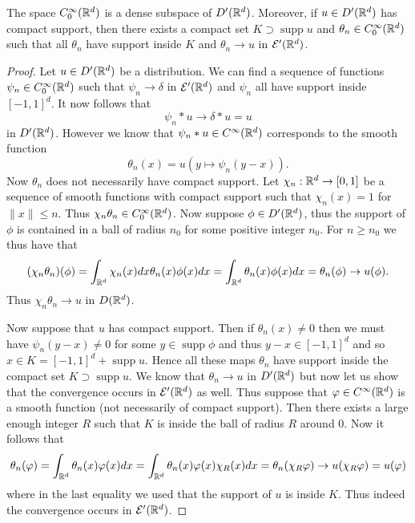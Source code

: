 \documentclass[twoside, a4paper, 10pt]{amsart}
\begin{document}
\begin{thm} The space $C_0^{\infty}(\mathbb{R}^d)$ is a dense subspace of $D'(\mathbb{R}^d)$. Moreover, if $u \in D'(\mathbb{R}^d)$ has compact support, then there exists a compact set $K \supset \operatorname{supp} u$ and $\theta_n \in C_0^{\infty}(\mathbb{R}^d)$  such that all $\theta_n$ have support inside $K$ and $\theta_n \to u$ in $\mathcal{E}'(\mathbb{R}^d)$.

\end{thm}

\begin{proof} Let $u \in D'(\mathbb{R}^d)$ be a distribution. We can find a sequence of functions $\psi_n \in C_0^{\infty}(\mathbb{R}^d)$ such that $\psi_n \to \delta$ in $\mathcal{E}'(\mathbb{R}^d)$ and $\psi_n$ all have support inside $[-1,1]^d$. It now follows that $$\psi_n * u \to \delta * u = u$$ in $D'(\mathbb{R}^d)$. However we know that $\psi_n * u \in C^{\infty}(\mathbb{R}^d)$ corresponds to the smooth function $$\theta_n(x) = u(y \mapsto \psi_n(y-x)).$$ Now $\theta_n$ does not necessarily have compact support. Let $\chi_n:\mathbb{R}^d \to [0,1]$ be a sequence of smooth functions with compact support such that $\chi_n(x)=1$ for $\|x \| \leq n$. Thus $\chi_n \theta_n \in C_0^{\infty}(\mathbb{R}^d)$. Now suppose $\phi \in D'(\mathbb{R}^d)$, thus the support of $\phi$ is contained in a ball of radius $n_0$ for some positive integer $n_0$. For $n\geq n_0$ we thus have that $$(\chi_n\theta_n) (\phi) = \int_{\mathbb{R}^d} \chi_n(x) dx \theta_n(x) \phi(x) dx = \int_{\mathbb{R}^d} \theta_n(x)\phi(x) dx = \theta_n(\phi) \to u(\phi). $$ Thus $\chi_n \theta_n \to u$ in $D(\mathbb{R}^d)$.

Now suppose that $u$ has compact support. Then if $\theta_n(x) \neq 0$ then we must have $\psi_n(y-x) \neq 0$ for some $y \in \operatorname{supp}\phi$ and thus $y-x \in [-1,1]^d$ and so $x \in K = [-1,1]^d + \operatorname{supp} u$. Hence all these maps $\theta_n$ have support inside the compact set $K \supset \operatorname{supp} u$. We know that $\theta_n \to u$ in $D'(\mathbb{R}^d)$ but now let us show that the convergence occurs in $\mathcal{E}'(\mathbb{R}^d)$ as well. Thus suppose that $\varphi \in C^{\infty}(\mathbb{R}^d)$ is a smooth function (not necessarily of compact support). Then there exists a large enough integer $R$ such that $K$ is inside the ball of radius $R$ around $0$. Now it follows that $$\theta_n(\varphi) = \int_{\mathbb{R}^d} \theta_n(x)\varphi(x) dx = \int_{\mathbb{R}^d} \theta_n(x)\varphi(x)\chi_R(x) dx = \theta_n(\chi_R \varphi) \to u(\chi_R\varphi) = u(\varphi) $$ where in the last equality we used that the support of $u$ is inside $K$. Thus indeed the convergence occurs in $\mathcal{E}'(\mathbb{R}^d)$. \end{proof}
\end{document}
